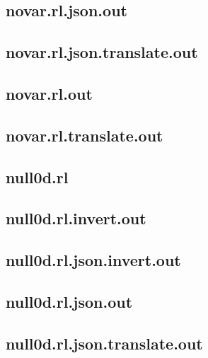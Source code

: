 \subsection{novar.rl.json.out}
\label{app:novar_rl.json.out}

\subsection{novar.rl.json.translate.out}
\label{app:novar_rl.json.translate.out}

\subsection{novar.rl.out}
\label{app:novar_rl.out}

\subsection{novar.rl.translate.out}
\label{app:novar_rl.translate.out}

\subsection{null0d.rl}
\label{app:null0d_rl}

\subsection{null0d.rl.invert.out}
\label{app:null0d_rl.invert.out}

\subsection{null0d.rl.json.invert.out}
\label{app:null0d_rl.json.invert.out}

\subsection{null0d.rl.json.out}
\label{app:null0d_rl.json.out}

\subsection{null0d.rl.json.translate.out}
\label{app:null0d_rl.json.translate.out}

